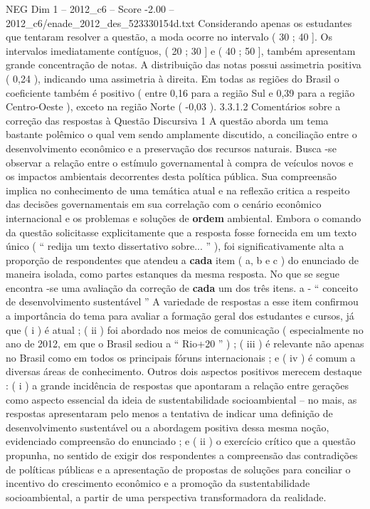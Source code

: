 \begin{textsample}{NEG Dim 1 – 2012\_c6 – Score -2.00 – 2012\_c6/enade\_2012\_des\_523330154d.txt}
Considerando apenas os estudantes que tentaram resolver a questão, a moda ocorre no intervalo ( 30 ; 40 ].
Os intervalos imediatamente contíguos, ( 20 ; 30 ] e ( 40 ; 50 ], também apresentam grande concentração de notas.
A distribuição das notas possui assimetria positiva ( 0,24 ), indicando uma assimetria à direita.
Em todas as regiões do Brasil o coeficiente também é positivo ( entre 0,16 para a região Sul e 0,39 para a região Centro-Oeste ), exceto na região Norte ( -0,03 ). 3.3.1.2 Comentários sobre a correção das respostas à Questão Discursiva 1 A questão aborda um tema bastante polêmico o qual vem sendo amplamente discutido, a conciliação entre o desenvolvimento econômico e a preservação dos recursos naturais.
Busca -se observar a relação entre o estímulo governamental à compra de veículos novos e os impactos ambientais decorrentes desta política pública.
Sua compreensão implica no conhecimento de uma temática atual e na reflexão critica a respeito das decisões governamentais em sua correlação com o cenário econômico internacional e os problemas e soluções de \textbf{ordem} ambiental.
Embora o comando da questão solicitasse explicitamente que a resposta fosse fornecida em um texto único ( “ redija um texto dissertativo sobre... ” ), foi significativamente alta a proporção de respondentes que atendeu a \textbf{cada} item ( a, b e c ) do enunciado de maneira isolada, como partes estanques da mesma resposta.
No que se segue encontra -se uma avaliação da correção de \textbf{cada} um dos três itens. a - “ conceito de desenvolvimento sustentável ” A variedade de respostas a esse item confirmou a importância do tema para avaliar a formação geral dos estudantes e cursos, já que ( i ) é atual ; ( ii ) foi abordado nos meios de comunicação ( especialmente no ano de 2012, em que o Brasil sediou a “ Rio+20 ” ) ; ( iii ) é relevante não apenas no Brasil como em todos os principais fóruns internacionais ; e ( iv ) é comum a diversas áreas de conhecimento.
Outros dois aspectos positivos merecem destaque : ( i ) a grande incidência de respostas que apontaram a relação entre gerações como aspecto essencial da ideia de sustentabilidade socioambiental – no mais, as respostas apresentaram pelo menos a tentativa de indicar uma definição de desenvolvimento sustentável ou a abordagem positiva dessa mesma noção, evidenciado compreensão do enunciado ; e ( ii ) o exercício crítico que a questão propunha, no sentido de exigir dos respondentes a compreensão das contradições de políticas públicas e a apresentação de propostas de soluções para conciliar o incentivo do crescimento econômico e a promoção da sustentabilidade socioambiental, a partir de uma perspectiva transformadora da realidade.

\end{textsample}
